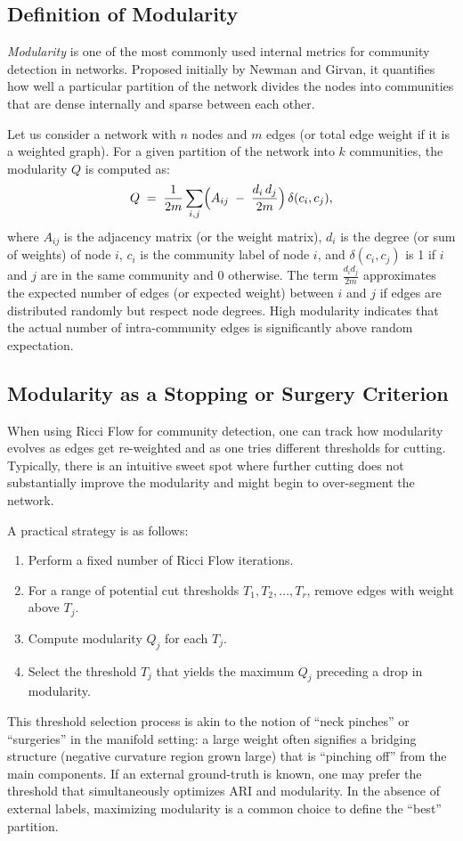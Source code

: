 \subsection{Definition of Modularity}
\emph{Modularity} is one of the most commonly used internal metrics for community detection in networks. Proposed initially by Newman and Girvan, it quantifies how well a particular partition of the network divides the nodes into communities that are dense internally and sparse between each other.

Let us consider a network with $n$ nodes and $m$ edges (or total edge weight if it is a weighted graph). For a given partition of the network into $k$ communities, the modularity $Q$ is computed as:
\begin{equation}
Q \;=\;\frac{1}{2m} \sum_{i,j}\Bigl(A_{ij} \;-\;\frac{d_i\,d_j}{2m}\Bigr) \,\delta(c_i, c_j),
\end{equation}
where $A_{ij}$ is the adjacency matrix (or the weight matrix), $d_i$ is the degree (or sum of weights) of node $i$, $c_i$ is the community label of node $i$, and $\delta(c_i, c_j)$ is 1 if $i$ and $j$ are in the same community and 0 otherwise. The term $\frac{d_i d_j}{2m}$ approximates the expected number of edges (or expected weight) between $i$ and $j$ if edges are distributed randomly but respect node degrees. High modularity indicates that the actual number of intra-community edges is significantly above random expectation.

\subsection{Modularity as a Stopping or Surgery Criterion}
When using Ricci Flow for community detection, one can track how modularity evolves as edges get re-weighted and as one tries different thresholds for cutting. Typically, there is an intuitive sweet spot where further cutting does not substantially improve the modularity and might begin to over-segment the network. 

A practical strategy is as follows:
\begin{enumerate}
    \item Perform a fixed number of Ricci Flow iterations. 
    \item For a range of potential cut thresholds $T_1, T_2, \dots, T_r$, remove edges with weight above $T_j$. 
    \item Compute modularity $Q_j$ for each $T_j$.
    \item Select the threshold $T_j$ that yields the maximum $Q_j$ preceding a drop in modularity.
\end{enumerate}
This threshold selection process is akin to the notion of “neck pinches” or “surgeries” in the manifold setting: a large weight often signifies a bridging structure (negative curvature region grown large) that is “pinching off” from the main components. If an external ground-truth is known, one may prefer the threshold that simultaneously optimizes ARI and modularity. In the absence of external labels, maximizing modularity is a common choice to define the “best” partition.

